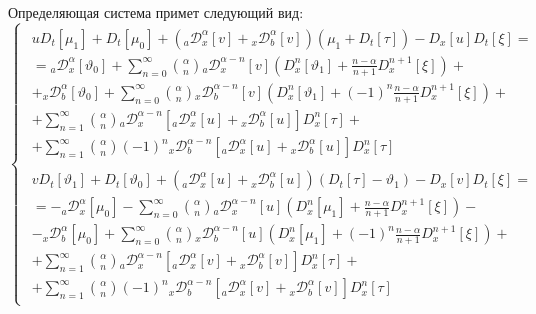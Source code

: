 \documentclass[a4paper, fontsize=14pt]{article}
\newcommand{\RLD}[3]{{}_{#1}\mathcal{D}_{#2}^{\alpha} \left[#3\right]} %
\newcommand{\D}[3]{D_{#1}^{#2} \left[ #3 \right]} %
\newcommand{\RLDa}[4]{{}_{#1}\mathcal{D}_{#2}^{#4} \left[#3\right]} %
\begin{document}
Определяющая система примет следующий вид:
\begin{equation}
  \label{eq:RL_def_sys}
  \begin{cases}
    \begin{aligned}
      u \D{t}{}{\mu_1} + \D{t}{}{\mu_0} + \left(\RLD{a}{x}{v} + \RLD{x}{b}{v}\right) \left(\mu_1 + \D{t}{}{\tau} \right) -  \D{x}{}{u} \D{t}{}{\xi} =                                     \\
      = \RLD{a}{x}{\vartheta _0} + \sum_{n=0}^{\infty} \binom{\alpha}{n} \RLDa{a}{x}{v}{\alpha - n}  \left( \D{x}{n}{\vartheta _1} + \frac{n-\alpha}{n+1} \D{x}{n+1}{\xi} \right)+        \\
      + \RLD{x}{b}{\vartheta _0} + \sum_{n=0}^{\infty} \binom{\alpha}{n} \RLDa{x}{b}{v}{\alpha - n} \left( \D{x}{n}{\vartheta _1} + (-1)^n \frac{n-\alpha}{n+1}  \D{x}{n+1}{\xi} \right)+ \\
      + \sum_{n=1}^{\infty} \binom{\alpha}{n} \RLDa{a}{x}{\RLD{a}{x}{u} + \RLD{x}{b}{u}}{\alpha-n} \D{x}{n}{\tau} +                                                                       \\
      + \sum_{n=1}^{\infty} \binom{\alpha}{n} (-1)^n \RLDa{x}{b}{\RLD{a}{x}{u} + \RLD{x}{b}{u}}{\alpha-n} \D{x}{n}{\tau}
    \end{aligned} \\

    \begin{aligned}
      v \D{t}{}{\vartheta _1} + \D{t}{}{\vartheta _0} + \left(\RLD{a}{x}{u} + \RLD{x}{b}{u}\right) \left(\D{t}{}{\tau} - \vartheta _1 \right) -  \D{x}{}{v} \D{t}{}{\xi} =  \\
      = - \RLD{a}{x}{\mu_0} - \sum_{n=0}^{\infty} \binom{\alpha}{n} \RLDa{a}{x}{u}{\alpha - n}  \left( \D{x}{n}{\mu_1} + \frac{n-\alpha}{n+1} \D{x}{n+1}{\xi} \right)-      \\
      - \RLD{x}{b}{\mu_0} + \sum_{n=0}^{\infty} \binom{\alpha}{n} \RLDa{x}{b}{u}{\alpha - n} \left( \D{x}{n}{\mu_1} + (-1)^n \frac{n-\alpha}{n+1}  \D{x}{n+1}{\xi} \right)+ \\
      + \sum_{n=1}^{\infty} \binom{\alpha}{n} \RLDa{a}{x}{\RLD{a}{x}{v} + \RLD{x}{b}{v}}{\alpha-n} \D{x}{n}{\tau} +                                                         \\
      + \sum_{n=1}^{\infty} \binom{\alpha}{n} (-1)^n \RLDa{x}{b}{\RLD{a}{x}{v} + \RLD{x}{b}{v}}{\alpha-n} \D{x}{n}{\tau}
    \end{aligned}
  \end{cases}
\end{equation}
\end{document}
